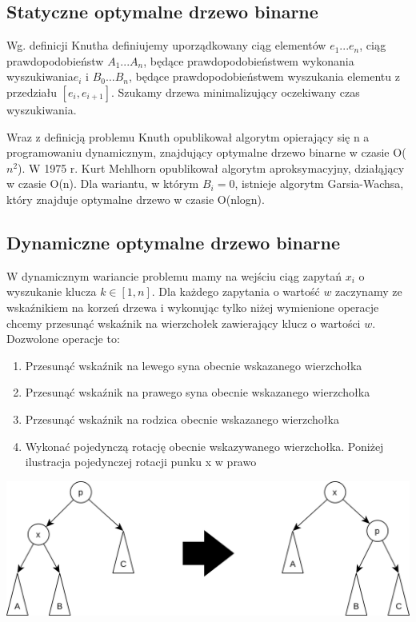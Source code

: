 \documentclass[declaration,shortabstract]{iithesis}
\begin{document}
\subsection{Statyczne optymalne drzewo binarne}  

Wg. definicji Knutha definiujemy uporządkowany ciąg elementów \(e_1...e_n\), ciąg prawdopodobieństw \(A_1...A_n\), będące prawdopodobieństwem wykonania wyszukiwania\(e_i\) i  \(B_0 … B_n\), będące prawdopodobieństwem wyszukania elementu z przedziału \([e_i, e_{i+1}]\). Szukamy drzewa minimalizujący oczekiwany czas wyszukiwania.  

Wraz z definicją problemu Knuth opublikował algorytm opierający się n a programowaniu dynamicznym, znajdujący optymalne drzewo binarne w czasie O(\(n^2\)). W 1975 r. Kurt Mehlhorn opublikował algorytm aproksymacyjny, działąjący w czasie O(n). Dla wariantu, w którym \(B_i = 0\), istnieje algorytm Garsia-Wachsa, który znajduje optymalne drzewo w czasie O(nlogn).  

\subsection{Dynamiczne optymalne drzewo binarne}  

W dynamicznym wariancie problemu mamy na wejściu ciąg zapytań \(x_i\) o wyszukanie klucza \(k \in [1, n]\). Dla każdego zapytania o wartość \(w\) zaczynamy ze wskaźnikiem na korzeń drzewa i wykonując tylko niżej wymienione operacje chcemy przesunąć wskaźnik na wierzchołek zawierający klucz o wartości \(w\). Dozwolone operacje to:  

\begin{enumerate}  

\item {Przesunąć wskaźnik na lewego syna obecnie wskazanego wierzchołka}  

\item {Przesunąć wskaźnik na prawego syna obecnie wskazanego wierzchołka}  

\item {Przesunąć wskaźnik na rodzica obecnie wskazanego wierzchołka}  

\item {Wykonać pojedynczą rotację obecnie wskazywanego wierzchołka. Poniżej ilustracja pojedynczej rotacji punku x w prawo}   

\end{enumerate}   

\includegraphics[scale = 0.75]{Splay_tree_zig.png}
\end{document}
